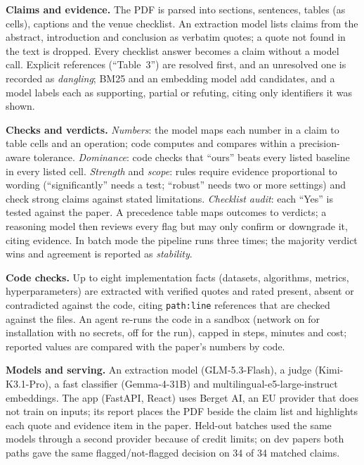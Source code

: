 \documentclass[10pt,twocolumn,twoside,letterpaper]{article}
\begin{document}
\textbf{Claims and evidence.} The PDF is parsed into sections, sentences, tables (as cells), captions and the
venue checklist. An extraction model lists claims from the abstract, introduction and conclusion as verbatim
quotes; a quote not found in the text is dropped. Every checklist answer becomes a claim without a model call.
Explicit references (``Table~3'') are resolved first, and an unresolved one is recorded as \emph{dangling};
BM25 \citep{robertson2009bm25} and an embedding model \citep{wang2024multilingual} add candidates, and a model
labels each as supporting, partial or refuting, citing only identifiers it was shown.

\textbf{Checks and verdicts.} \emph{Numbers}: the model maps each number in a claim to table cells and an
operation; code computes and compares within a precision-aware tolerance. \emph{Dominance}: code checks that
``ours'' beats every listed baseline in every listed cell. \emph{Strength} and \emph{scope}: rules require
evidence proportional to wording (``significantly'' needs a test; ``robust'' needs two or more settings) and
check strong claims against stated limitations. \emph{Checklist audit}: each ``Yes'' is tested against the
paper. A precedence table maps outcomes to verdicts; a reasoning model then reviews every flag but may only
confirm or downgrade it, citing evidence. In batch mode the pipeline runs three times; the majority verdict
wins and agreement is reported as \emph{stability}.

\textbf{Code checks.} Up to eight implementation facts (datasets, algorithms, metrics, hyperparameters) are
extracted with verified quotes and rated present, absent or contradicted against the code, citing
\texttt{path:line} references that are checked against the files. An agent re-runs the code in a sandbox
(network on for installation with no secrets, off for the run), capped in steps, minutes and cost; reported
values are compared with the paper's numbers by code.

\textbf{Models and serving.} An extraction model (GLM-5.3-Flash), a judge (Kimi-K3.1-Pro), a fast classifier
(Gemma-4-31B) and multilingual-e5-large-instruct embeddings. The app (FastAPI, React) uses Berget AI, an EU
provider that does not train on inputs; its report places the PDF beside the claim list and highlights each
quote and evidence item in the paper. Held-out batches used the same models through a second provider because
of credit limits; on dev papers both paths gave the same flagged/not-flagged decision on 34 of 34 matched
claims.
\end{document}
